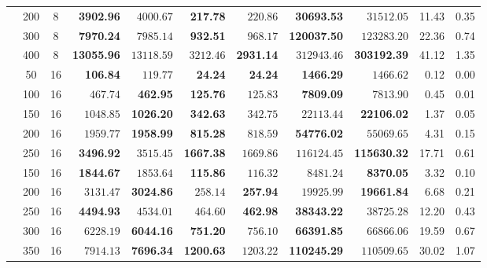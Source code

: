 \documentclass[runningheads]{llncs}
\begin{document}
\begin{table}[!t]
{\begin{tabular}{|c|c|c|rr|rr|rr|rr|}
 & 200 & 8 & \textbf{3902.96} & $4000.67$ & \textbf{217.78} & $220.86$ & \textbf{30693.53} & $31512.05$ & 11.43 & 0.35 \\
 & 300 & 8 & \textbf{7970.24} & $7985.14$ & \textbf{932.51} & $968.17$ & \textbf{120037.50} & $123283.20$ & 22.36 & 0.74 \\
 & 400 & 8 & \textbf{13055.96} & $13118.59$ & $3212.46$ & \textbf{2931.14} & $312943.46$ & \textbf{303192.39} & 41.12 & 1.35 \\ \hline
{} 
 & 50 & 16 & \textbf{106.84} & $119.77$ & \textbf{24.24} & \textbf{24.24} & \textbf{1466.29} & $1466.62$ & 0.12 & 0.00 \\
 & 100 & 16 & $467.74$ & \textbf{462.95} & \textbf{125.76} & $125.83$ & \textbf{7809.09} & $7813.90$ & 0.45 & 0.01 \\
 & 150 & 16 & $1048.85$ & \textbf{1026.20} & \textbf{342.63} & $342.75$ & $22113.44$ & \textbf{22106.02} & 1.37 & 0.05 \\
 & 200 & 16 & $1959.77$ & \textbf{1958.99} & \textbf{815.28} & $818.59$ & \textbf{54776.02} & $55069.65$ & 4.31 & 0.15 \\
 & 250 & 16 & \textbf{3496.92} & $3515.45$ & \textbf{1667.38} & $1669.86$ & $116124.45$ & \textbf{115630.32} & 17.71 & 0.61 \\ \hline
{} 
 & 150 & 16 & \textbf{1844.67} & $1853.64$ & \textbf{115.86} & $116.32$ & $8481.24$ & \textbf{8370.05} & 3.32 & 0.10 \\
 & 200 & 16 & $3131.47$ & \textbf{3024.86} & $258.14$ & \textbf{257.94} & $19925.99$ & \textbf{19661.84} & 6.68 & 0.21 \\
 & 250 & 16 & \textbf{4494.93} & $4534.01$ & $464.60$ & \textbf{462.98} & \textbf{38343.22} & $38725.28$ & 12.20 & 0.43 \\
 & 300 & 16 & $6228.19$ & \textbf{6044.16} & \textbf{751.20} & $756.10$ & \textbf{66391.85} & $66866.06$ & 19.59 & 0.67 \\
 & 350 & 16 & $7914.13$ & \textbf{7696.34} & \textbf{1200.63} & $1203.22$ & \textbf{110245.29} & $110509.65$ & 30.02 & 1.07 \\ \hline
\end{tabular}
}
\end{table}
\end{document}
